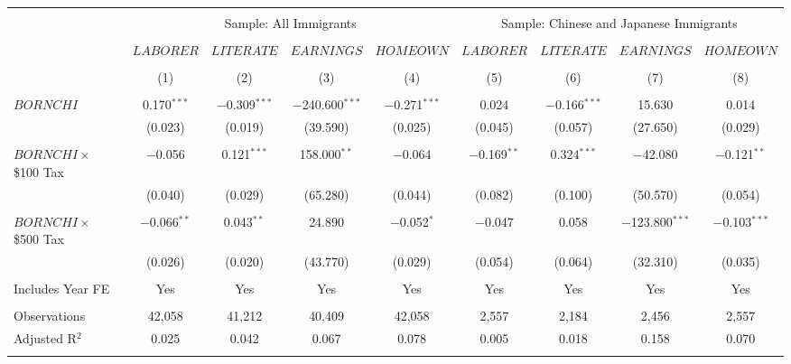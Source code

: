 
\begin{tabular}{@{\extracolsep{5pt}}lcccccccc} 
\\[-1.8ex]\hline 
\hline \\[-1.8ex] 
 & \multicolumn{4}{c}{Sample: All Immigrants} & \multicolumn{4}{c}{Sample: Chinese and Japanese Immigrants} \\ 
 \cline{2-5} \cline{6-9}
 \\[-1.8ex] & $LABORER$ & $LITERATE$ & $EARNINGS$ & $HOMEOWN$ & $LABORER$ & $LITERATE$ & $EARNINGS$ & $HOMEOWN$ \\ 
\\[-1.8ex] & (1) & (2) & (3) & (4) & (5) & (6) & (7) & (8)\\ 
\hline \\[-1.8ex] 
 $BORNCHI$ & 0.170$^{***}$ & $-$0.309$^{***}$ & $-$240.600$^{***}$ & $-$0.271$^{***}$ & 0.024 & $-$0.166$^{***}$ & 15.630 & 0.014 \\ 
  & (0.023) & (0.019) & (39.590) & (0.025) & (0.045) & (0.057) & (27.650) & (0.029) \\ 
  & & & & & & & & \\ 
 $BORNCHI \times$ \$100 Tax & $-$0.056 & 0.121$^{***}$ & 158.000$^{**}$ & $-$0.064 & $-$0.169$^{**}$ & 0.324$^{***}$ & $-$42.080 & $-$0.121$^{**}$ \\ 
  & (0.040) & (0.029) & (65.280) & (0.044) & (0.082) & (0.100) & (50.570) & (0.054) \\ 
  & & & & & & & & \\ 
 $BORNCHI \times$ \$500 Tax & $-$0.066$^{**}$ & 0.043$^{**}$ & 24.890 & $-$0.052$^{*}$ & $-$0.047 & 0.058 & $-$123.800$^{***}$ & $-$0.103$^{***}$ \\ 
  & (0.026) & (0.020) & (43.770) & (0.029) & (0.054) & (0.064) & (32.310) & (0.035) \\ 
  & & & & & & & & \\ 
Includes Year FE & Yes & Yes & Yes & Yes & Yes & Yes & Yes & Yes \\ 
\hline \\[-1.8ex] 
Observations & 42,058 & 41,212 & 40,409 & 42,058 & 2,557 & 2,184 & 2,456 & 2,557 \\ 
Adjusted R$^{2}$ & 0.025 & 0.042 & 0.067 & 0.078 & 0.005 & 0.018 & 0.158 & 0.070 \\ 
\hline \\[-1.8ex] 
\end{tabular} 
